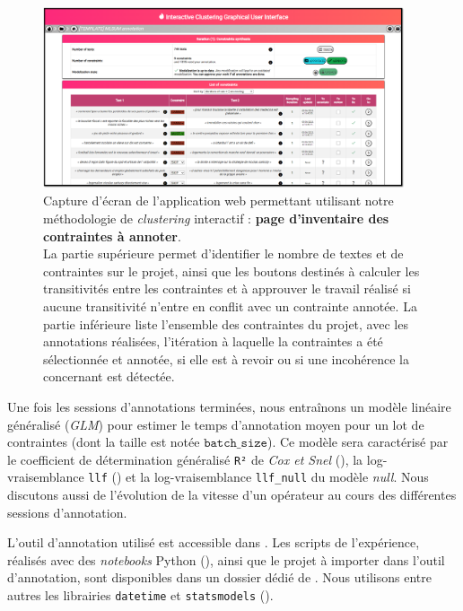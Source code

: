 			\begin{figure}[!htb]
				\centering
				\includegraphics[width=0.95\textwidth]{figures/etude-temps-annotation-0application-liste-contraintes}
				\caption{
					Capture d'écran de l'application web permettant utilisant notre méthodologie de \textit{clustering} interactif : \textbf{page d'inventaire des contraintes à annoter}.\\
					La partie supérieure permet d'identifier le nombre de textes et de contraintes sur le projet, ainsi que les boutons destinés à calculer les transitivités entre les contraintes et à approuver le travail réalisé si aucune transitivité n'entre en conflit avec un contrainte annotée.
					La partie inférieure liste l'ensemble des contraintes du projet, avec les annotations réalisées, l'itération à laquelle la contraintes a été sélectionnée et annotée, si elle est à revoir ou si une incohérence la concernant est détectée.
				}
				\label{figure:4.3.1-ETUDE-COUTS-TEMPS-ANNOTATION-APPLICATION-LISTE-CONTRAINTES}
			\end{figure}
			
			
			Une fois les sessions d'annotations terminées, nous entraînons un modèle linéaire généralisé (\textit{GLM}) pour estimer le temps d'annotation moyen pour un lot de contraintes (dont la taille est notée $\texttt{batch\_size}$).
			Ce modèle sera caractérisé par le coefficient de détermination généralisé \texttt{R²} de \textit{Cox et Snel} (\cite{diamond-etal:1990:analysis-binary-data}), la log-vraisemblance \texttt{llf} (\cite{edwards:1992:likelihood}) et la log-vraisemblance \texttt{llf\_null} du modèle \textit{null}.
			Nous discutons aussi de l'évolution de la vitesse d'un opérateur au cours des différentes sessions d'annotation.

			\begin{leftBarInformation}
				L'outil d'annotation utilisé est accessible dans \cite{schild-etal:2022:cognitivefactory-interactiveclusteringgui}.
				Les scripts de l'expérience, réalisés avec des \textit{notebooks} Python (\cite{van-rossum-drake:2009:python-reference-manual}), ainsi que le projet à importer dans l'outil d'annotation, sont disponibles dans un dossier dédié de \cite{schild:2021:cognitivefactory-interactiveclusteringcomparativestudy}.
				Nous utilisons entre autres les librairies \texttt{datetime} et \texttt{statsmodels} (\cite{seabold-perktold:2010:statsmodels-econometric-statistical}).
			\end{leftBarInformation}

